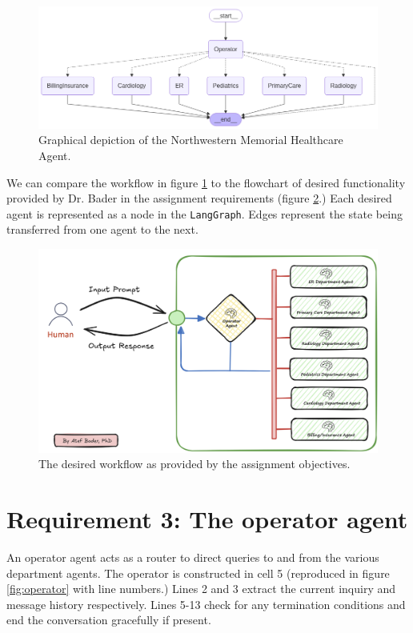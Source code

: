 \documentclass[11pt,letterpaper]{article}
\begin{document}
\begin{figure}[h!]
    \centering
    \includegraphics[width=1.0\linewidth]{Assignment_04_NOTEBOOK_Geidel_13_0.png}
    \caption{Graphical depiction of the Northwestern Memorial Healthcare Agent.}
    \label{fig:graph}
\end{figure}

We can compare the workflow in figure \ref{fig:graph} to the flowchart of desired functionality provided by Dr. Bader in the assignment requirements (figure \ref{fig:workflow}.) Each desired agent is represented as a node in the \texttt{LangGraph}. Edges represent the state being transferred from one agent to the next. 

\clearpage

\begin{figure}[h!]
    \centering
    \includegraphics[width=0.7\linewidth]{target_workflow.png}
    \caption{The desired workflow as provided by the assignment objectives.}
    \label{fig:workflow}
\end{figure}


\section*{Requirement 3: The operator agent}
\tab An operator agent acts as a router to direct queries to and from the various department agents. 
The operator is constructed in cell 5 (reproduced in figure \ref{fig:operator} with line numbers.) 
Lines 2 and 3 extract the current inquiry and message history respectively. Lines 5-13 check for any termination conditions and end the conversation gracefully if present.
\end{document}
